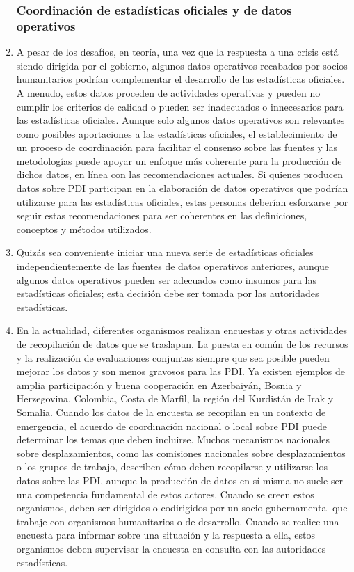 \documentclass[
]{book}
\begin{document}
\begin{enumerate}
{  \subsubsection{Coordinación de estadísticas oficiales y de datos operativos}\label{coordinaciuxf3n-de-estaduxedsticas-oficiales-y-de-datos-operativos}}
\item
  A pesar de los desafíos, en teoría, una vez que la respuesta a una crisis está siendo dirigida por el gobierno, algunos datos operativos recabados por socios humanitarios podrían complementar el desarrollo de las estadísticas oficiales. A menudo, estos datos proceden de actividades operativas y pueden no cumplir los criterios de calidad o pueden ser inadecuados o innecesarios para las estadísticas oficiales. Aunque solo algunos datos operativos son relevantes como posibles aportaciones a las estadísticas oficiales, el establecimiento de un proceso de coordinación para facilitar el consenso sobre las fuentes y las metodologías puede apoyar un enfoque más coherente para la producción de dichos datos, en línea con las recomendaciones actuales. Si quienes producen datos sobre PDI participan en la elaboración de datos operativos que podrían utilizarse para las estadísticas oficiales, estas personas deberían esforzarse por seguir estas recomendaciones para ser coherentes en las definiciones, conceptos y métodos utilizados.
\item
  Quizás sea conveniente iniciar una nueva serie de estadísticas oficiales independientemente de las fuentes de datos operativos anteriores, aunque algunos datos operativos pueden ser adecuados como insumos para las estadísticas oficiales; esta decisión debe ser tomada por las autoridades estadísticas.
\item
  En la actualidad, diferentes organismos realizan encuestas y otras actividades de recopilación de datos que se traslapan. La puesta en común de los recursos y la realización de evaluaciones conjuntas siempre que sea posible pueden mejorar los datos y son menos gravosos para las PDI. Ya existen ejemplos de amplia participación y buena cooperación en Azerbaiyán, Bosnia y Herzegovina, Colombia, Costa de Marfil, la región del Kurdistán de Irak y Somalia. Cuando los datos de la encuesta se recopilan en un contexto de emergencia, el acuerdo de coordinación nacional o local sobre PDI puede determinar los temas que deben incluirse. Muchos mecanismos nacionales sobre desplazamientos, como las comisiones nacionales sobre desplazamientos o los grupos de trabajo, describen cómo deben recopilarse y utilizarse los datos sobre las PDI, aunque la producción de datos en sí misma no suele ser una competencia fundamental de estos actores. Cuando se creen estos organismos, deben ser dirigidos o codirigidos por un socio gubernamental que trabaje con organismos humanitarios o de desarrollo. Cuando se realice una encuesta para informar sobre una situación y la respuesta a ella, estos organismos deben supervisar la encuesta en consulta con las autoridades estadísticas.

\end{enumerate}
\end{document}
